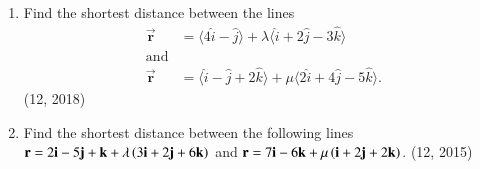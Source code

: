 \begin{enumerate}[label=\thesubsection.\arabic*,ref=\thesubsection.\theenumi]
\item Find the shortest distance between the lines 
\begin{align*}
\overrightarrow{\mathbf{r}} &= \langle 4\hat{i} - \hat{j} \rangle + \lambda \langle \hat{i} + 2\hat{j} - 3\hat{k} \rangle \\
\text{and} \\
\overrightarrow{\mathbf{r}} &= \langle \hat{i} - \hat{j} + 2\hat{k} \rangle + \mu \langle 2\hat{i} + 4\hat{j} - 5\hat{k} \rangle.
\end{align*}
\hfill (12, 2018)
\item Find the shortest distance between the following lines
$\mathbf{r} = 2\mathbf{i}-5\mathbf{j}+\mathbf{k} +\lambda\left(3\mathbf{i}+2\mathbf{j}+6\mathbf{k}\right)$ and $\mathbf{r} = 7\mathbf{i}-6\mathbf{k}+\mu\left(\mathbf{i}+2\mathbf{j}+2\mathbf{k}\right)$. \hfill (12, 2015)
\end{enumerate}
